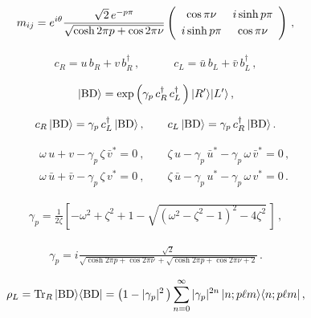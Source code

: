 \begin{eqnarray}
m_{ij}=e^{i\theta}\frac{\sqrt{2}\,e^{-p\pi}}{\sqrt{\cosh 2\pi p+\cos 2\pi\nu}}
\left(
\begin{array}{cc}
\cos \pi\nu & i\sinh p\pi \vspace{1mm}\\
i\sinh p\pi & \cos \pi\nu \\
\end{array}
\right)\,,
\label{mij2}
\end{eqnarray}



\begin{eqnarray}
c_R = u\,b_R + v\,b_R^\dagger \,,\qquad\quad
c_L = \bar{u}\,b_L + \bar{v}\,b_L^\dagger\,,
\label{bc}
\end{eqnarray}


\begin{eqnarray}
|{\rm BD}\rangle = \exp\left(\gamma_p\,c_R^\dagger\,c_L^\dagger\,\right)|R'\rangle|L'\rangle\,,
\label{bogoliubov2}
\end{eqnarray}


\begin{eqnarray}
c_R\,|{\rm BD}\rangle= \gamma_p\,c_L^\dagger\,|{\rm BD}\rangle \,,\qquad
c_L\,|{\rm BD}\rangle = \gamma_p\,c_R^\dagger\,|{\rm BD}\rangle\,.
\label{consistency}
\end{eqnarray}

\begin{eqnarray}
&&\omega\,u + v -\gamma_p\,\zeta\,\bar{v}^* =0 \ , \qquad
\zeta\,u - \gamma_p\,\bar{u}^* - \gamma_p\,\omega\,\bar{v}^* =0\,,
\label{system1}\\
&&\omega\,\bar{u} + \bar{v} -\gamma_p\,\zeta\,v^* =0 \ , \qquad
\zeta\,\bar{u} - \gamma_p\,u^* - \gamma_p\,\omega\,v^* =0\,.
\label{system2}
\end{eqnarray}


\begin{eqnarray}
\gamma_p=\frac{1}{2\zeta}\left[-\omega^2+\zeta^2+1-\sqrt{\left(\omega^2-\zeta^2-1\right)^2-4\zeta^2}\,\right]\,,
\label{gammap}
\end{eqnarray}


\begin{eqnarray}
\gamma_p = i\frac{\sqrt{2}}{\sqrt{\cosh 2\pi p + \cos 2\pi \nu}
 + \sqrt{\cosh 2\pi p + \cos 2\pi \nu +2 }}\,.
\label{gammap2}
\end{eqnarray}


\begin{eqnarray}
\rho_L ={\rm Tr}_{R}\,|{\rm BD}\rangle\langle{\rm BD}|
=\left(1-|\gamma_p|^2\,\right)\sum_{n=0}^\infty |\gamma_p |^{2n}\,|n;p\ell m\rangle\langle n;p\ell m|\,,
\label{densitymatrix1}
\end{eqnarray}

